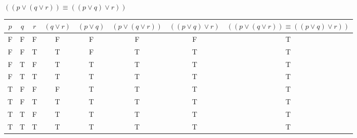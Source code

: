 \documentclass{article}
\begin{document}
$((p \vee (q \vee r)) \equiv ((p \vee q) \vee r))$
\begin{center}
    \begin{NiceTabular}{|c|c|c|c|c|c|c|c|}
        \hline
        $p$ & $q$ & $r$ & $(q \vee r)$ & $(p \vee q)$ & $(p \vee (q \vee r))$ & $((p \vee q) \vee r)$ & $((p \vee (q \vee r)) \equiv ((p \vee q) \vee r))$\\
        \hline
        \ttfamily F & \ttfamily F & \ttfamily F & \ttfamily F & \ttfamily F & \ttfamily F & \ttfamily F & \ttfamily T\\
        \ttfamily F & \ttfamily F & \ttfamily T & \ttfamily T & \ttfamily F & \ttfamily T & \ttfamily T & \ttfamily T\\
        \ttfamily F & \ttfamily T & \ttfamily F & \ttfamily T & \ttfamily T & \ttfamily T & \ttfamily T & \ttfamily T\\
        \ttfamily F & \ttfamily T & \ttfamily T & \ttfamily T & \ttfamily T & \ttfamily T & \ttfamily T & \ttfamily T\\
        \ttfamily T & \ttfamily F & \ttfamily F & \ttfamily F & \ttfamily T & \ttfamily T & \ttfamily T & \ttfamily T\\
        \ttfamily T & \ttfamily F & \ttfamily T & \ttfamily T & \ttfamily T & \ttfamily T & \ttfamily T & \ttfamily T\\
        \ttfamily T & \ttfamily T & \ttfamily F & \ttfamily T & \ttfamily T & \ttfamily T & \ttfamily T & \ttfamily T\\
        \ttfamily T & \ttfamily T & \ttfamily T & \ttfamily T & \ttfamily T & \ttfamily T & \ttfamily T & \ttfamily T\\
        \hline
    \end{NiceTabular}
\end{center}
\clearpage
\end{document}
